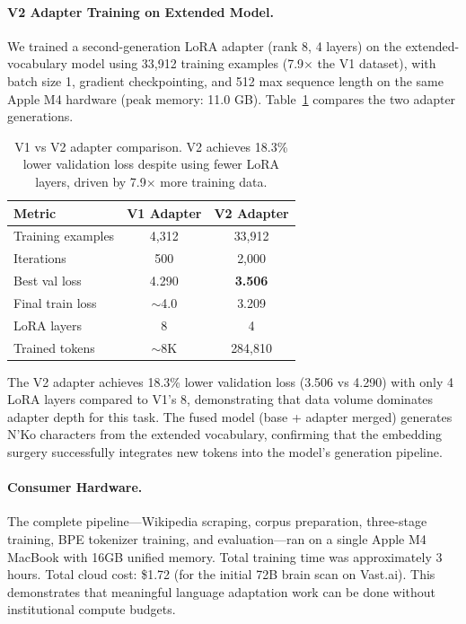 \documentclass[11pt]{article}
\begin{document}
\paragraph{V2 Adapter Training on Extended Model.}
We trained a second-generation LoRA adapter (rank 8, 4 layers) on the extended-vocabulary model using 33,912 training examples (7.9$\times$ the V1 dataset), with batch size 1, gradient checkpointing, and 512 max sequence length on the same Apple M4 hardware (peak memory: 11.0 GB).
Table~\ref{tab:v2-results} compares the two adapter generations.

\begin{table}[t]
\centering
\small
\begin{tabular}{lcc}
\toprule
\textbf{Metric} & \textbf{V1 Adapter} & \textbf{V2 Adapter} \\
\midrule
Training examples & 4,312 & 33,912 \\
Iterations & 500 & 2,000 \\
Best val loss & 4.290 & \textbf{3.506} \\
Final train loss & $\sim$4.0 & 3.209 \\
LoRA layers & 8 & 4 \\
Trained tokens & $\sim$8K & 284,810 \\
\bottomrule
\end{tabular}
\caption{V1 vs V2 adapter comparison. V2 achieves 18.3\% lower validation loss despite using fewer LoRA layers, driven by 7.9$\times$ more training data.}
\label{tab:v2-results}
\end{table}

The V2 adapter achieves 18.3\% lower validation loss (3.506 vs 4.290) with only 4 LoRA layers compared to V1's 8, demonstrating that data volume dominates adapter depth for this task.
The fused model (base + adapter merged) generates N'Ko characters from the extended vocabulary, confirming that the embedding surgery successfully integrates new tokens into the model's generation pipeline.

\paragraph{Consumer Hardware.}
The complete pipeline---Wikipedia scraping, corpus preparation, three-stage training, BPE tokenizer training, and evaluation---ran on a single Apple M4 MacBook with 16GB unified memory.
Total training time was approximately 3 hours.
Total cloud cost: \$1.72 (for the initial 72B brain scan on Vast.ai).
This demonstrates that meaningful language adaptation work can be done without institutional compute budgets.
\end{document}
